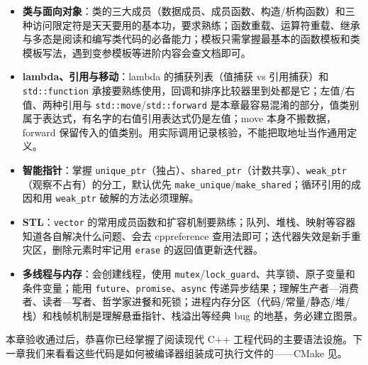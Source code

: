 \documentclass[
  lang=cn,
  scheme=chinese,
  chinesefont=ctexfont,
  11pt,
  oneside,
  device=normal,
  color=cyan,
  mode=fancy
]{../templates/elegantbook}
\begin{document}
\begin{itemize}
\item \textbf{类与面向对象}：类的三大成员（数据成员、成员函数、构造/析构函数）和三种访问限定符是天天要用的基本功，要求熟练；函数重载、运算符重载、继承与多态是阅读和编写类代码的必备能力；模板只需掌握最基本的函数模板和类模板写法，遇到变参模板等进阶内容会查文档即可。
\item \textbf{lambda、引用与移动}：lambda 的捕获列表（值捕获 vs 引用捕获）和 \texttt{std::function} 承接要熟练使用，回调和排序比较器里到处都是它；左值/右值、两种引用与 \texttt{std::move}/\texttt{std::forward} 是本章最容易混淆的部分，值类别属于表达式，有名字的右值引用表达式仍是左值；move 本身不搬数据，forward 保留传入的值类别。用实际调用记录核验，不能把取地址当作通用定义。
\item \textbf{智能指针}：掌握 \texttt{unique\_ptr}（独占）、\texttt{shared\_ptr}（计数共享）、\texttt{weak\_ptr}（观察不占有）的分工，默认优先 \texttt{make\_unique}/\texttt{make\_shared}；循环引用的成因和用 \texttt{weak\_ptr} 破解的方法必须理解。
\item \textbf{STL}：\texttt{vector} 的常用成员函数和扩容机制要熟练；队列、堆栈、映射等容器知道各自解决什么问题、会去 cppreference 查用法即可；迭代器失效是新手重灾区，删除元素时牢记用 \texttt{erase} 的返回值更新迭代器。
\item \textbf{多线程与内存}：会创建线程，使用 \texttt{mutex}/\texttt{lock\_guard}、共享锁、原子变量和条件变量；能用 \texttt{future}、\texttt{promise}、\texttt{async} 传递异步结果；理解生产者—消费者、读者—写者、哲学家进餐和死锁；进程内存分区（代码/常量/静态/堆/栈）和栈帧机制是理解悬垂指针、栈溢出等经典 bug 的地基，务必建立图景。
\end{itemize}

本章验收通过后，恭喜你已经掌握了阅读现代 C++ 工程代码的主要语法设施。下一章我们来看看这些代码是如何被编译器组装成可执行文件的——CMake 见。
\end{document}
